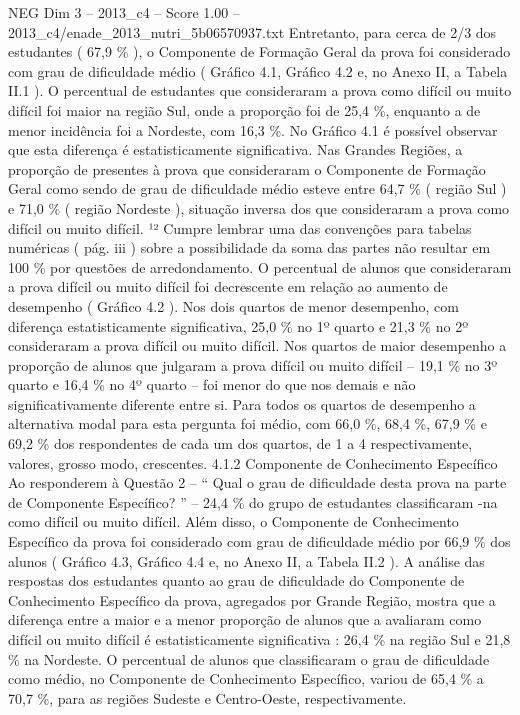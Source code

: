\begin{textsample}{NEG Dim 3 – 2013\_c4 – Score 1.00 – 2013\_c4/enade\_2013\_nutri\_5b06570937.txt}
Entretanto, para cerca de 2/3 dos estudantes ( 67,9 \% ), o Componente de Formação Geral da prova foi considerado com grau de dificuldade médio ( Gráfico 4.1, Gráfico 4.2 e, no Anexo II, a Tabela II.1 ).
O percentual de estudantes que consideraram a prova como difícil ou muito difícil foi maior na região Sul, onde a proporção foi de 25,4 \%, enquanto a de menor incidência foi a Nordeste, com 16,3 \%.
No Gráfico 4.1 é possível observar que esta diferença é estatisticamente significativa.
Nas Grandes Regiões, a proporção de presentes à prova que consideraram o Componente de Formação Geral como sendo de grau de dificuldade médio esteve entre 64,7 \% ( região Sul ) e 71,0 \% ( região Nordeste ), situação inversa dos que consideraram a prova como difícil ou muito difícil. ¹² Cumpre lembrar uma das convenções para tabelas numéricas ( pág. iii ) sobre a possibilidade da soma das partes não resultar em 100 \% por questões de arredondamento.
O percentual de alunos que consideraram a prova difícil ou muito difícil foi decrescente em relação ao aumento de desempenho ( Gráfico 4.2 ).
Nos dois quartos de menor desempenho, com diferença estatisticamente significativa, 25,0 \% no 1º quarto e 21,3 \% no 2º consideraram a prova difícil ou muito difícil.
Nos quartos de maior desempenho a proporção de alunos que julgaram a prova difícil ou muito difícil – 19,1 \% no 3º quarto e 16,4 \% no 4º quarto – foi menor do que nos demais e não significativamente diferente entre si.
Para todos os quartos de desempenho a alternativa modal para esta pergunta foi médio, com 66,0 \%, 68,4 \%, 67,9 \% e 69,2 \% dos respondentes de cada um dos quartos, de 1 a 4 respectivamente, valores, grosso modo, crescentes. 4.1.2 Componente de Conhecimento Específico Ao responderem à Questão 2 – “ Qual o grau de dificuldade desta prova na parte de Componente Específico? ” – 24,4 \% do grupo de estudantes classificaram -na como difícil ou muito difícil.
Além disso, o Componente de Conhecimento Específico da prova foi considerado com grau de dificuldade médio por 66,9 \% dos alunos ( Gráfico 4.3, Gráfico 4.4 e, no Anexo II, a Tabela II.2 ).
A análise das respostas dos estudantes quanto ao grau de dificuldade do Componente de Conhecimento Específico da prova, agregados por Grande Região, mostra que a diferença entre a maior e a menor proporção de alunos que a avaliaram como difícil ou muito difícil é estatisticamente significativa : 26,4 \% na região Sul e 21,8 \% na Nordeste.
O percentual de alunos que classificaram o grau de dificuldade como médio, no Componente de Conhecimento Específico, variou de 65,4 \% a 70,7 \%, para as regiões Sudeste e Centro-Oeste, respectivamente.

\end{textsample}
